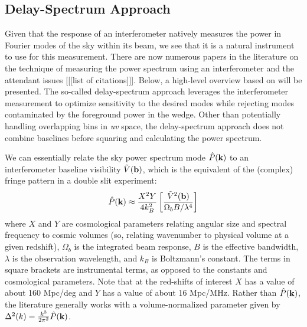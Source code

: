\documentclass[preprint,11pt]{aastex}
\newcommand{\kvec}{{\bf k}}
\newcommand{\bvec}{{\bf b}}
\begin{document}
\subsection{Delay-Spectrum Approach}
\label{sec:delayapproach}
Given that the response of an interferometer natively measures the power in Fourier modes of the sky within its beam, we see that it is a natural instrument to use for this measurement.  There are now numerous papers in the literature on the technique of measuring the power spectrum using an interferometer and the attendant issues [[[list of citations]]].  Below, a high-level overview based on  \cite{parsons_et_al2012b} will be presented. The so-called delay-spectrum approach leverages the interferometer measurement to optimize sensitivity to the desired modes while rejecting modes contaminated by the foreground power in the wedge.  Other than potentially handling overlapping bins in {\em uv} space, the delay-spectrum approach does not combine baselines before squaring and calculating the power spectrum.

We can essentially relate the sky power spectrum mode ${\hat P}(\kvec)$ to an interferometer baseline visibility ${\tilde V}(\bvec)$, which is the equivalent of the (complex) fringe pattern in a double slit experiment:
\begin{equation}
{\hat P}(\kvec) \approx\frac{X^2Y}{4k_B^2}   \left[\frac{{\tilde V}^2(\bvec)}{\Omega_b B/ \lambda^4} \right]
\label{eq:Pk_baseline}
\end{equation}
where $X$ and $Y$ are cosmological parameters relating angular size and spectral frequency to cosmic volumes (so, relating wavenumber to physical volume at a given redshift), $\Omega_b$ is the integrated beam response, $B$ is the effective bandwidth, $\lambda$ is the observation wavelength, and $k_B$ is Boltzmann's constant.  The terms in square brackets are instrumental terms, as opposed to the constants and cosmological parameters.  
Note that at the red-shifts of interest $X$ has a value of about 160 Mpc/deg and $Y$ has a value of about 16 Mpc/MHz.
Rather than ${\hat P}(\kvec)$, the literature generally works with a volume-normalized parameter given by $\Delta^2(k) = \frac{k^3}{2\pi^2}{\hat P}(\kvec)$.    
\end{document}
